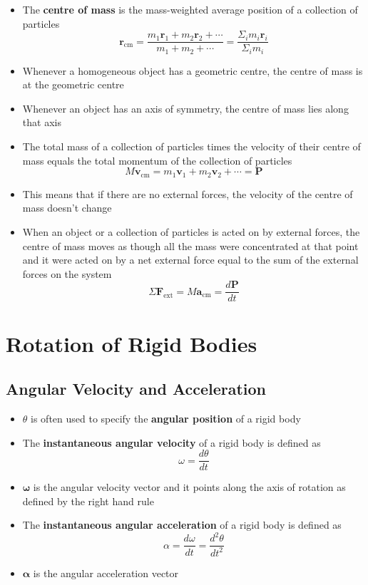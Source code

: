 \documentclass{article}
\begin{document}
\begin{itemize}
  \item The \textbf{centre of mass} is the mass-weighted average position of a collection of particles \[\mathbf{r}_\textrm{cm}=\frac{m_1\mathbf{r}_1+m_2\mathbf{r}_2+\cdots}{m_1+m_2+\cdots}=\frac{\Sigma_i m_i\mathbf{r}_i}{\Sigma_i m_i}\]

  \item Whenever a homogeneous object has a geometric centre, the centre of mass is at the geometric centre

  \item Whenever an object has an axis of symmetry, the centre of mass lies along that axis

  \item The total mass of a collection of particles times the velocity of their centre of mass equals the total momentum of the collection of particles \[M\mathbf{v}_\textrm{cm}=m_1\mathbf{v}_1+m_2\mathbf{v}_2+\cdots=\mathbf{P}\]

  \item This means that if there are no external forces, the velocity of the centre of mass doesn't change

  \item When an object or a collection of particles is acted on by external forces, the centre of mass moves as though all the mass were concentrated at that point and it were acted on by a net external force equal to the sum of the external forces on the system \[\Sigma\mathbf{F}_\textrm{ext}=M\mathbf{a}_\textrm{cm}=\frac{d\mathbf{P}}{dt}\]
\end{itemize}

\section{Rotation of Rigid Bodies}

\subsection{Angular Velocity and Acceleration}

\begin{itemize}
  \item $\theta$ is often used to specify the \textbf{angular position} of a rigid body

  \item The \textbf{instantaneous angular velocity} of a rigid body is defined as \[\omega=\frac{d\theta}{dt}\]

  \item $\bm\omega$ is the angular velocity vector and it points along the axis of rotation as defined by the right hand rule

  \item The \textbf{instantaneous angular acceleration} of a rigid body is defined as \[\alpha=\frac{d\omega}{dt}=\frac{d^2\theta}{dt^2}\]

  \item $\bm\alpha$ is the angular acceleration vector
\end{itemize}
\end{document}

